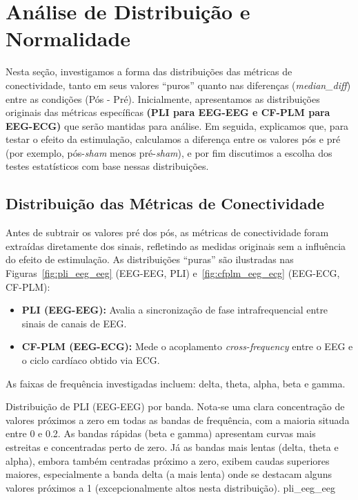 \chapter{Análise de Distribuição e Normalidade}
\label{chap:analise_distribuicao_normalidade}
Nesta seção, investigamos a forma das distribuições das métricas de conectividade, tanto em seus valores ``puros'' quanto nas diferenças (\textit{median\_diff}) entre as condições (Pós - Pré). Inicialmente, apresentamos as distribuições originais das métricas específicas \textbf{(PLI para EEG-EEG e CF-PLM para EEG-ECG)} que serão mantidas para análise. Em seguida, explicamos que, para testar o efeito da estimulação, calculamos a diferença entre os valores pós e pré (por exemplo, pós-\textit{sham} menos pré-\textit{sham}), e por fim discutimos a escolha dos testes estatísticos com base nessas distribuições.

\section{Distribuição das Métricas de Conectividade}
Antes de subtrair os valores pré dos pós, as métricas de conectividade foram extraídas diretamente dos sinais, refletindo as medidas originais sem a influência do efeito de estimulação. As distribuições ``puras'' são ilustradas nas Figuras~\ref{fig:pli_eeg_eeg} (EEG-EEG, PLI) e~\ref{fig:cfplm_eeg_ecg} (EEG-ECG, CF-PLM):
\begin{itemize}
    \item \textbf{PLI (EEG-EEG):} Avalia a sincronização de fase intrafrequencial entre sinais de canais de EEG.
    \item \textbf{CF-PLM (EEG-ECG):} Mede o acoplamento \textit{cross-frequency} entre o EEG e o ciclo cardíaco obtido via ECG.
\end{itemize}

As faixas de frequência investigadas incluem: delta, theta, alpha, beta e gamma.

\clearpage
{Distribuição de PLI (EEG-EEG) por banda. Nota-se uma clara concentração de valores próximos a zero em todas as bandas de frequência, com a maioria situada entre 0 e 0.2. As bandas rápidas (beta e gamma) apresentam curvas mais estreitas e concentradas perto de zero. Já as bandas mais lentas (delta, theta e alpha), embora também centradas próximo a zero, exibem caudas superiores maiores, especialmente a banda delta (a mais lenta) onde se destacam alguns valores próximos a 1 (excepcionalmente altos nesta distribuição).}
{pli_eeg_eeg}

